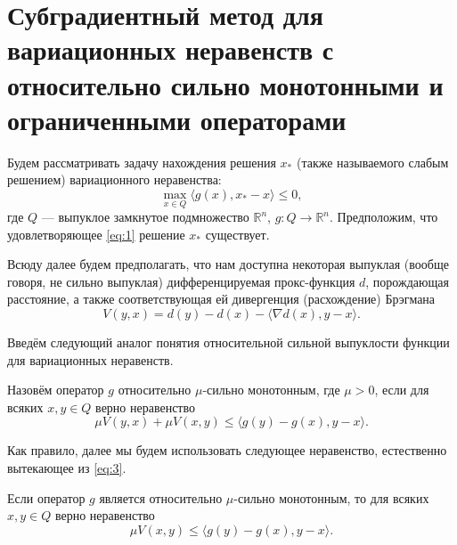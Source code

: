 \section{Субградиентный метод для вариационных неравенств с относительно сильно монотонными и ограниченными операторами}\label{sec:ch2/sec2}

    Будем рассматривать задачу нахождения решения $x_*$ (также называемого слабым решением) вариационного неравенства: 
    \begin{equation}\label{eq:1}
        \max_{x \in Q} \langle g(x), x_* - x \rangle \leq 0,
    \end{equation}
    где $Q$ --- выпуклое замкнутое подмножество $\mathbb{R}^n$,
    $g: Q \longrightarrow \mathbb{R}^n$. Предположим, что удовлетворяющее \eqref{eq:1} решение $x_*$ существует.

    Всюду далее будем предполагать, что нам доступна некоторая выпуклая (вообще говоря, не сильно выпуклая) дифференцируемая прокс-функция $d$, порождающая расстояние, а также соответствующая ей дивергенция (расхождение) Брэгмана \cite{Bauschke}
    \begin{equation}\label{Brg_form}
        V(y, x) = d(y) - d(x) - \langle \nabla d(x), y - x \rangle.
    \end{equation}

    Введём следующий аналог понятия относительной сильной выпуклости функции \cite{Lu_Nesterov_2018} для вариационных неравенств.
    \begin{definition}\label{DefRelStrongMonot}
        Назовём оператор $g$ относительно $\mu$-сильно монотонным, где $\mu >0$, если для всяких $x, y \in Q$ верно неравенство
            \begin{equation}\label{eq:3}
                 \mu V(y, x) + \mu V(x, y) \leq \langle g(y) - g(x), y - x \rangle.
             \end{equation}
    \end{definition}
    Как правило, далее мы будем использовать следующее неравенство, естественно вытекающее из \eqref{eq:3}.
    \begin{remark}
        Если оператор $g$ является  относительно $\mu$-сильно монотонным, то для всяких $x, y \in Q$ верно неравенство
        $$
            \mu V(x, y) \leq \langle g(y) - g(x), y - x \rangle.
        $$
    \end{remark}

